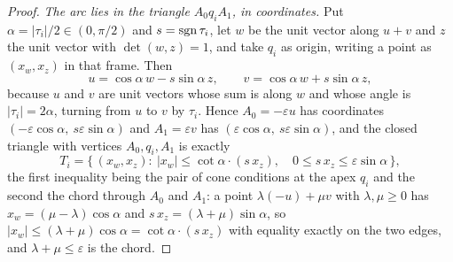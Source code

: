\begin{proof}
\emph{The arc lies in the triangle $A_0q_iA_1$, in coordinates.} Put
$\alpha=|\tau_i|/2\in(0,\pi/2)$ and $s=\operatorname{sgn}\tau_i$, let $w$ be the unit vector
along $u+v$ and $z$ the unit vector with $\det(w,z)=1$, and take $q_i$ as
origin, writing a point as $(x_w,x_z)$ in that frame. Then
\[
   u=\cos\alpha\,w-s\sin\alpha\,z,
   \qquad
   v=\cos\alpha\,w+s\sin\alpha\,z,
\]
because $u$ and $v$ are unit vectors whose sum is along $w$ and whose angle is
$|\tau_i|=2\alpha$, turning from $u$ to $v$ by $\tau_i$. Hence
$A_0=-\varepsilon u$ has coordinates $(-\varepsilon\cos\alpha,\ s\varepsilon
\sin\alpha)$ and $A_1=\varepsilon v$ has $(\varepsilon\cos\alpha,\
s\varepsilon\sin\alpha)$, and the closed triangle with vertices $A_0,q_i,A_1$
is exactly
\begin{equation}
   T_i=\bigl\{\,(x_w,x_z):\ |x_w|\leq\cot\alpha\cdot(s\,x_z),
   \quad 0\leq s\,x_z\leq\varepsilon\sin\alpha\,\bigr\},
\label{eq:triangle}
\end{equation}
the first inequality being the pair of cone conditions at the apex $q_i$ and the
second the chord through $A_0$ and $A_1$: a point $\lambda(-u)+\mu v$ with
$\lambda,\mu\geq0$ has $x_w=(\mu-\lambda)\cos\alpha$ and
$s\,x_z=(\lambda+\mu)\sin\alpha$, so $|x_w|\leq(\lambda+\mu)\cos\alpha=\cot\alpha
\cdot(s\,x_z)$ with equality exactly on the two edges, and $\lambda+\mu\leq
\varepsilon$ is the chord.


\end{proof}
